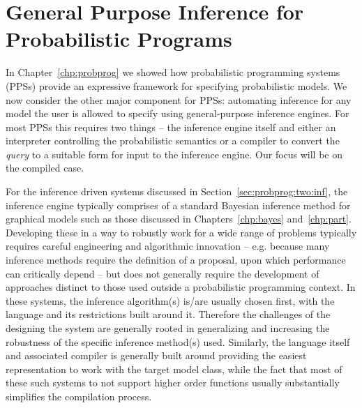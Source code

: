 
\chapter{General Purpose Inference for Probabilistic Programs}
\label{chp:proginf}

In Chapter~\ref{chp:probprog} we showed how probabilistic programming systems (PPSs) provide
an expressive framework for specifying probabilistic models.  We now consider the other major component
for PPSs: automating inference for any model the user is allowed to specify using general-purpose
inference engines.  For most PPSs this requires two things --  the inference engine itself and
either an interpreter controlling the probabilistic semantics or a compiler to convert the \emph{query} to a
suitable form for input to the inference engine.   Our focus will be on the compiled case. 

For the inference
driven systems discussed in Section~\ref{sec:probprog:two:inf}, the inference engine typically comprises of
a standard Bayesian inference method for graphical models such as those discussed in Chapters~\ref{chp:bayes}
and~\ref{chp:part}.  Developing these in a way to robustly work for a wide range of problems typically
requires careful engineering and algorithmic innovation -- e.g. because many inference methods require the definition of
a proposal, upon which performance can critically depend -- but does not generally require the development 
of approaches distinct to those used outside a probabilistic programming context.  In these 
systems, the inference algorithm(s) is/are usually chosen first, with the language and its restrictions built around it.
Therefore the challenges of the designing the system are generally rooted in generalizing and increasing the robustness of the 
specific inference method(s) used.  Similarly, the language itself and associated compiler is generally built
around providing the easiest representation to work with the target model class, while the fact that most of
these such systems to not support higher order functions usually substantially simplifies the compilation
process.

